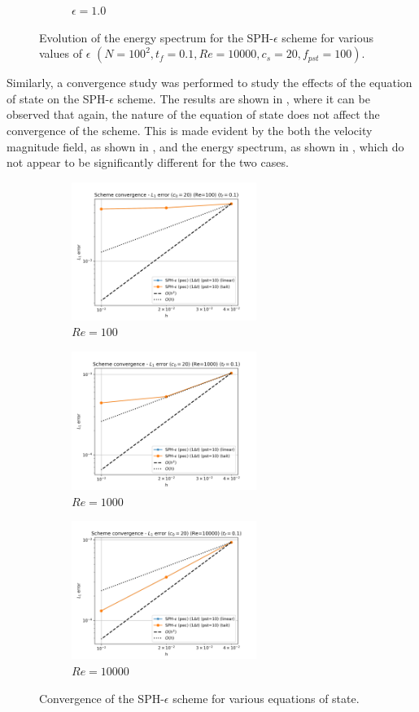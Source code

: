 \begin{figure}[htbp!]
\begin{subfigure}{7cm}
  \caption{$\epsilon = 1.0$}
  \end{subfigure}
  \caption{Evolution of the energy spectrum for the SPH-$\epsilon$ scheme for various values of $\epsilon$ $(N=100^2, t_f=0.1, Re=10000, c_s=20, f_{pst}=100)$.}
  \label{fig:sph-eps-meps-espec}
\end{figure}

Similarly, a convergence study was performed to study the effects of the equation of state on the SPH-$\epsilon$ scheme. The results are shown in , where it can be observed that again, the nature of the equation of state does not affect the convergence of the scheme.
This is made evident by the both the velocity magnitude field, as shown in , and the energy spectrum, as shown in , which do not appear to be significantly different for the two cases.

\begin{figure}[htbp!]
  \begin{subfigure}{7cm}
  \centering\includegraphics[width=6cm]{Code-Figures/mon2017/eos/dt_pois_conv_c0_20_re_100.png}
  \caption{$Re = 100$}
  \end{subfigure}
  \begin{subfigure}{7cm}
  \centering\includegraphics[width=6cm]{Code-Figures/mon2017/eos/dt_pois_conv_c0_20_re_1000.png}
  \caption{$Re = 1000$}
  \end{subfigure}
  \begin{subfigure}{7cm}
  \centering\includegraphics[width=6cm]{Code-Figures/mon2017/eos/dt_pois_conv_c0_20_re_10000.png}
  \caption{$Re = 10000$}
  \end{subfigure}
  \caption{Convergence of the SPH-$\epsilon$ scheme for various equations of state.}
  \label{fig:sph-eps-eos}
\end{figure}

